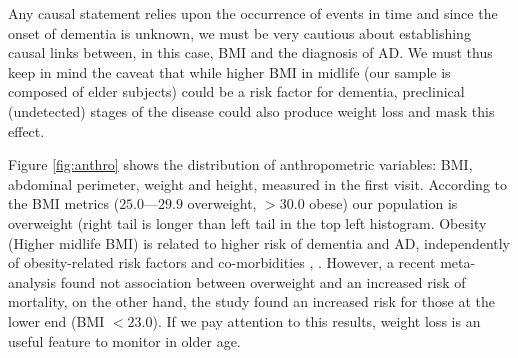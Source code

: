 \documentclass[11pt]{article}
\theoremstyle{definition}
\theoremstyle{remark}
\begin{document}
Any causal statement relies upon the occurrence of events in time and since the onset of dementia is unknown, we must be very cautious about establishing causal links between, in this case, BMI and the diagnosis of AD.   
We must thus keep in mind the caveat that while higher BMI in midlife (our sample is composed of elder subjects) 
could be a risk factor for dementia, preclinical (undetected) stages of the disease could also produce weight loss and mask this effect. 

Figure \ref{fig:anthro} shows the distribution of anthropometric variables: BMI, abdominal perimeter, weight and height, measured in the first visit. 
According to the BMI metrics ($25.0—29.9$ overweight, $>30.0$ obese) our population is overweight (right tail is longer than left tail in the top left histogram. Obesity (Higher midlife BMI) is related to higher risk of dementia and AD, independently of obesity-related risk factors and co-morbidities \cite{tolppanen2014midlife}, \cite{nepal2014rising}. However, a recent meta-analysis \cite{winter2014bmi} found not association between overweight and an increased risk of mortality, on the other hand, the study found an increased risk for those at the lower end (BMI $< 23.0$). If we pay attention to this results, weight loss is an useful feature to monitor in older age.
\end{document}
